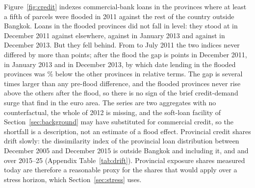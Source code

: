 Figure~\ref{fig:credit} indexes commercial-bank loans in the provinces where at least a fifth of parcels were flooded in 2011 against the rest of the country outside Bangkok. Loans in the flooded provinces did not fall in level: they stood at \credFloodedDecEleven{} in December 2011 against \credOtherDecEleven{} elsewhere, \credFloodedJanThirteen{} against \credOtherJanThirteen{} in January 2013 and \credFloodedDecThirteen{} against \credOtherDecThirteen{} in December 2013. But they fell behind. From \credPreStart{} to July 2011 the two indices never differed by more than \credPreMaxGap{} points; after the flood the gap is \credGapDecEleven{} points in December 2011, \credGapJanThirteen{} in January 2013 and \credGapDecThirteen{} in December 2013, by which date lending in the flooded provinces was \credRelDecThirteen\% below the other provinces in relative terms. The gap is several times larger than any pre-flood difference, and the flooded provinces never rise above the others after the flood, so there is no sign of the brief credit-demand surge that \citet{albertazzi2026physical} find in the euro area. The series are two aggregates with no counterfactual, the whole of 2012 is missing, and the soft-loan facility of Section~\ref{sec:background} may have substituted for commercial credit, so the shortfall is a description, not an estimate of a flood effect. Provincial credit shares drift slowly: the dissimilarity index of the provincial loan distribution between December 2005 and December 2015 is \driftTenOut{} outside Bangkok and \driftTenWith{} including it, and \driftRecentOut{} and \driftRecentWith{} over 2015--25 (Appendix Table~\ref{tab:drift}). Provincial exposure shares measured today are therefore a reasonable proxy for the shares that would apply over a stress horizon, which Section~\ref{sec:stress} uses.

\begin{table}[t]
\centering\footnotesize
\caption{Appraisal-based residential price index around three floods, relative to other regions}\label{tab:rppi}

\end{table}

